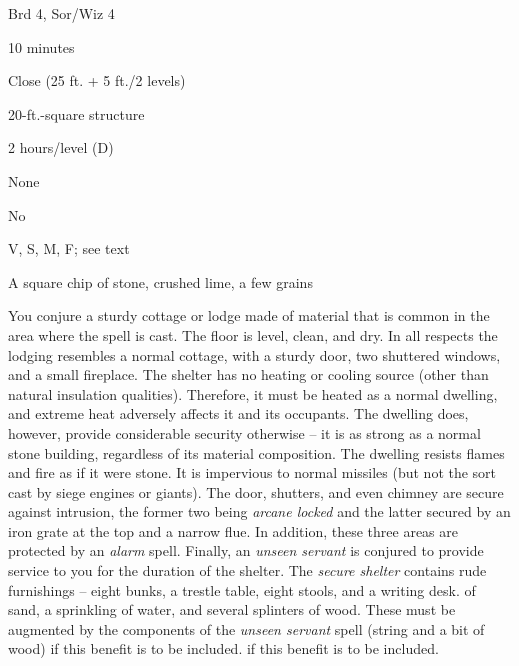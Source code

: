 
\begin{description*}
\item[Level:] Brd 4, Sor/Wiz 4
\item[Casting Time:] 10 minutes
\item[Range:] Close (25 ft. + 5 ft./2 levels)
\item[Effect:] 20-ft.-square structure
\item[Duration:] 2 hours/level (D)
\item[Saving Throw:] None
\item[Spell Resistance:] No
\item[Components:] V, S, M, F; see text
\item[Arcane Material Component:] A square chip of stone, crushed lime, a few grains
\end{description*}

You conjure a sturdy cottage or lodge made of material that is common in the area
where the spell is cast. The floor is level, clean, and dry. In all respects the
lodging resembles a normal cottage, with a sturdy door, two shuttered windows,
and a small fireplace.
The shelter has no heating or cooling source (other than natural insulation qualities).
Therefore, it must be heated as a normal dwelling, and extreme heat adversely affects
it and its occupants. The dwelling does, however, provide considerable security
otherwise -- it is as strong as a normal stone building, regardless of its material
composition. The dwelling resists flames and fire as if it were stone. It is impervious
to normal missiles (but not the sort cast by siege engines or giants).
The door, shutters, and even chimney are secure against intrusion, the former two
being \textit{arcane locked} and the latter secured by an iron grate at the top
and a narrow flue. In addition, these three areas are protected by an \textit{alarm
}spell. Finally, an \textit{unseen servant} is conjured to provide service to you
for the duration of the shelter.
The \textit{secure shelter} contains rude furnishings  -- eight bunks, a trestle
table, eight stools, and a writing desk.
of sand, a sprinkling of water, and several splinters of wood. These must be augmented
by the components of the \textit{unseen servant} spell (string and a bit of wood)
if this benefit is to be included.
if this benefit is to be included.